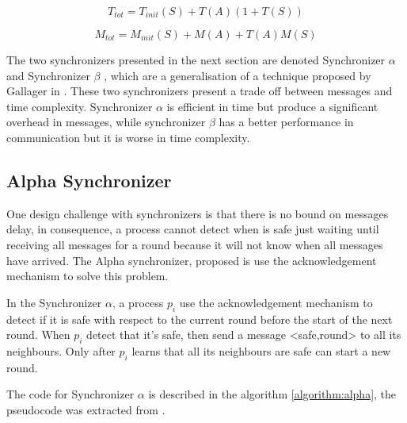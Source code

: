 \begin{equation}
\label{ec:mess}
 T_{tot} = T_{init}(S) + T(A)(1+T(S)) 
\end{equation}

\begin{equation}
\label{ec:time}
M_{tot} = M_{init}(S) + M(A) + T(A)M(S) 
\end{equation}


The two synchronizers presented in the next section are denoted Synchronizer $\alpha$ and Synchronizer $\beta$ \cite{awerbuch1985complexity}, which are a generalisation of a technique proposed by Gallager in \cite{gallager1982distributed}. These two synchronizers present a trade off between messages and time complexity. Synchronizer $\alpha$ is efficient in time but produce a significant overhead in messages, while synchronizer $\beta$ has a better performance in communication but it is worse in time complexity.



\subsection{Alpha Synchronizer}

One design challenge with synchronizers is that there is no bound on messages delay, in consequence, a process cannot detect when is safe just waiting until receiving all messages for a round because it will not know when all messages have arrived. The Alpha synchronizer, proposed is \cite{awerbuch1985complexity} use the acknowledgement mechanism to solve this problem. 

In the Synchronizer $\alpha$, a process $p_i$ use the acknowledgement mechanism to detect if it is safe with respect to the current round before the start of the next round. When $p_i$ detect that it's safe, then send a message <safe,round> to all its neighbours. Only after $p_i$ learns that all its neighbours are safe can start a new round.

The code for Synchronizer $\alpha$ is described in the algorithm \ref{algorithm:alpha}, the pseudocode was extracted from \cite{attiya2004distributed}.  



